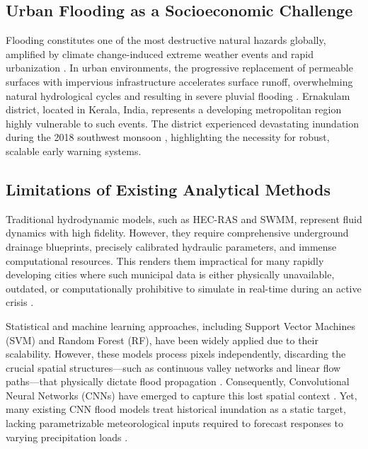 \documentclass[conference]{IEEEtran}
\begin{document}
\subsection{Urban Flooding as a Socioeconomic Challenge}
Flooding constitutes one of the most destructive natural hazards globally, amplified by climate change-induced extreme weather events and rapid urbanization \cite{1}. In urban environments, the progressive replacement of permeable surfaces with impervious infrastructure accelerates surface runoff, overwhelming natural hydrological cycles and resulting in severe pluvial flooding \cite{2}. Ernakulam district, located in Kerala, India, represents a developing metropolitan region highly vulnerable to such events. The district experienced devastating inundation during the 2018 southwest monsoon \cite{3}, highlighting the necessity for robust, scalable early warning systems.

\subsection{Limitations of Existing Analytical Methods}
Traditional hydrodynamic models, such as HEC-RAS and SWMM, represent fluid dynamics with high fidelity. However, they require comprehensive underground drainage blueprints, precisely calibrated hydraulic parameters, and immense computational resources. This renders them impractical for many rapidly developing cities where such municipal data is either physically unavailable, outdated, or computationally prohibitive to simulate in real-time during an active crisis \cite{4}.

Statistical and machine learning approaches, including Support Vector Machines (SVM) and Random Forest (RF), have been widely applied due to their scalability. However, these models process pixels independently, discarding the crucial spatial structures---such as continuous valley networks and linear flow paths---that physically dictate flood propagation \cite{5,6}. Consequently, Convolutional Neural Networks (CNNs) have emerged to capture this lost spatial context \cite{7,8}. Yet, many existing CNN flood models treat historical inundation as a static target, lacking parametrizable meteorological inputs required to forecast responses to varying precipitation loads \cite{9,12}.
\end{document}
